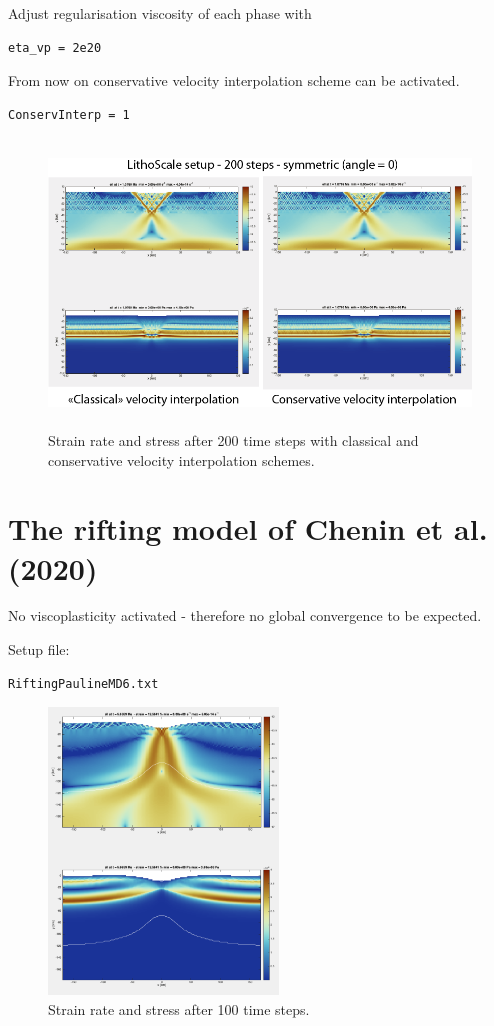\documentclass[12pt,english,openany]{scrbook}
\begin{document}
Adjust regularisation viscosity of each phase with
\begin{verbatim} 
eta_vp = 2e20
\end{verbatim}

From now on conservative velocity interpolation scheme can be activated.
\begin{verbatim} 
ConservInterp = 1
\end{verbatim}


\begin{figure}[ht!]
\centerline{\includegraphics[height=3.0in]{./Figures/LithoScale_MDOODZ.png}}
\caption{Strain rate and stress after 200 time steps with classical and conservative velocity interpolation schemes.}
\label{LithoScale_MDOODZ}
\end{figure}

\section{The rifting model of Chenin et al. (2020)}

No viscoplasticity activated - therefore no global convergence to be expected.

Setup file:
\begin{verbatim} 
RiftingPaulineMD6.txt
\end{verbatim}

\begin{figure}[ht!]
\centerline{\includegraphics[height=3.0in]{./Figures/RiftingPauline_MDOODZ1.png}}
\caption{Strain rate and stress after 100 time steps.}
\label{RiftingPauline_MDOODZ1}
\end{figure}
\end{document}
